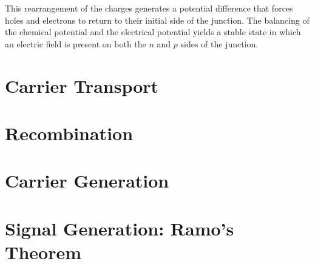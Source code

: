 This rearrangement of the charges generates a potential difference that forces holes and electrons to return to their initial side of the junction. The balancing of the chemical potential and the electrical potential yields a stable state in which an electric field is present on both the $n$ and $p$ sides of the junction.  


\section{Carrier Transport}


\section{Recombination} 

\section{Carrier Generation}

\section{Signal Generation: Ramo's Theorem} %

